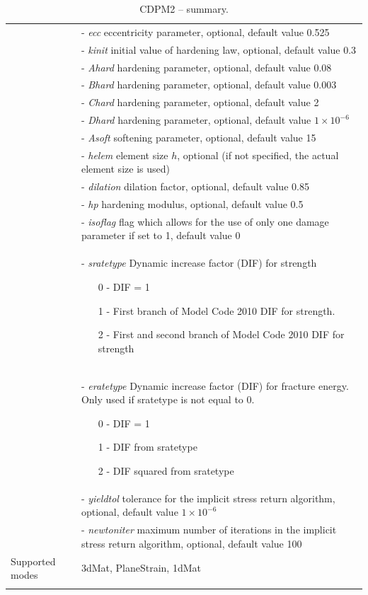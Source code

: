 \documentclass[a4paper]{article}
\newcommand{\param}[1]{{\it #1}}
\begin{document}
\begin{longtable}{|l|p{9cm}|}
&- \param{ecc} eccentricity parameter, optional, default value 0.525\\
&- \param{kinit} initial value of hardening law, optional, default value 0.3\\
&- \param{Ahard} hardening parameter, optional, default value 0.08\\
&- \param{Bhard} hardening parameter, optional, default value 0.003\\
&- \param{Chard} hardening parameter, optional, default value 2\\
&- \param{Dhard} hardening parameter, optional, default value $1\times 10^{-6}$\\
&- \param{Asoft} softening parameter, optional, default value 15\\
&- \param{helem} element size $h$, optional (if not specified, the actual element size is used)\\
&- \param{dilation} dilation factor, optional, default value 0.85\\
&- \param{hp} hardening modulus, optional, default value 0.5\\
&- \param{isoflag} flag which allows for the use of only one damage parameter if set to 1, default value 0\\
&- \param{sratetype}  Dynamic increase factor (DIF) for strength
\begin{itemize}\setlength{\itemsep}{-3pt}
\item[0 -] DIF = 1  
\item[1 -] First branch of Model Code 2010 DIF for strength.
\item[2 -] First and second branch of Model Code 2010 DIF for strength
\end{itemize}\\
&- \param{eratetype} Dynamic increase factor (DIF) for fracture energy. Only used if sratetype is not equal to 0. 
\begin{itemize}\setlength{\itemsep}{-3pt}
\item[0 -] DIF = 1
\item[1 -] DIF from sratetype  
\item[2 -] DIF squared from sratetype
\end{itemize}\\
&- \param{yieldtol} tolerance for the implicit stress return algorithm, optional, default value $1 \times 10^{-6}$\\
&- \param{newtoniter} maximum number of iterations in the implicit stress return algorithm, optional, default value 100\\
Supported modes& 3dMat, PlaneStrain, 1dMat\\
\hline
\caption{CDPM2 -- summary.}
\label{cdpm2_table}
\end{longtable}
\end{document}

